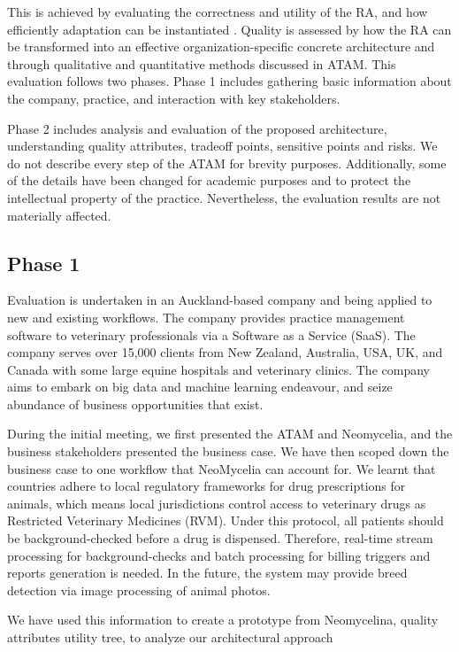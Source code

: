 \documentclass[conference]{IEEEtran}
\begin{document}
This is achieved by evaluating the correctness and utility of the RA, and how efficiently adaptation can be instantiated \cite{GALSTER}. Quality is assessed by how the RA can be transformed into an effective organization-specific concrete architecture and through qualitative and quantitative methods discussed in ATAM. This evaluation follows two phases. Phase 1 includes gathering basic information about the company, practice, and interaction with key stakeholders.

Phase 2 includes analysis and evaluation of the proposed architecture, understanding quality attributes, tradeoff points, sensitive points and risks. We do not describe every step of the ATAM for brevity purposes. Additionally, some of the details have been changed for academic purposes and to protect the intellectual property of the practice. Nevertheless, the evaluation results are not materially affected.

\subsection{Phase 1}

Evaluation is undertaken in an Auckland-based company and being applied to new and existing workflows. The company provides practice management software to veterinary professionals via a Software as a Service (SaaS). The company serves over 15,000 clients from New Zealand, Australia, USA, UK, and Canada with some large equine hospitals and veterinary clinics. The company aims to embark on big data and machine learning endeavour, and seize abundance of business opportunities that exist.

During the initial meeting, we first presented the ATAM and Neomycelia, and the business stakeholders presented the business case. We have then scoped down the business case to one workflow that NeoMycelia can account for. We learnt that countries adhere to local regulatory frameworks for drug prescriptions for animals, which means local jurisdictions control access to veterinary drugs as Restricted Veterinary Medicines (RVM). Under this protocol, all patients should be background-checked before a drug is dispensed. Therefore, real-time stream processing for background-checks and batch processing for billing triggers and reports generation is needed.  In the future, the system may provide breed detection via image processing of animal photos.

We have used this information to create a prototype from Neomycelina,  quality attributes utility tree, to analyze our architectural approach
\end{document}
